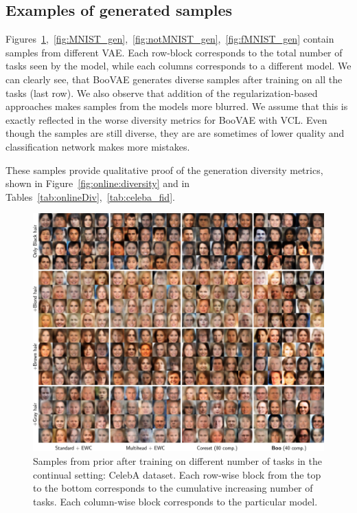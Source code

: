 \clearpage
\subsection{Examples of generated samples} \label{app:samples}
Figures~\ref{fig:celeba_gen},~\ref{fig:MNIST_gen},~\ref{fig:notMNIST_gen},~\ref{fig:fMNIST_gen} contain samples from different VAE. Each row-block corresponds to the total number of tasks seen by the model, while each columns corresponds to a different model. We can clearly see, that BooVAE generates diverse samples after training on all the tasks (last row). We also observe that addition of the regularization-based approaches makes samples from the models more blurred. We assume that this is exactly reflected in the worse diversity metrics for BooVAE with VCL. Even though the samples are still diverse, they are are sometimes of lower quality and classification network makes more mistakes.  

These samples provide qualitative proof of the generation diversity metrics, shown in Figure~\ref{fig:online:diversity} and in Tables~\ref{tab:onlineDiv},~\ref{tab:celeba_fid}. 

\begin{figure}[ht]
		\centering
		\includegraphics[width=\textwidth]{pics/1_boovae/celeba_full.pdf}
		\caption{Samples from prior after training on different number of tasks in the continual setting: CelebA dataset. Each row-wise block from the top to the bottom corresponds to the cumulative increasing number of tasks. Each column-wise block corresponds to the particular model.}
		\label{fig:celeba_gen}
\end{figure}

